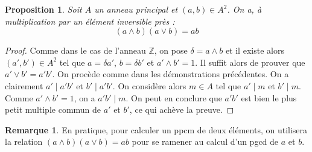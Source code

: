 \documentclass[french]{book}
\newcommand{\Z}{\mathbb{Z}}
\theoremstyle{plain}
\newtheorem{prop}{Proposition}[chapter]
\theoremstyle{definition}
\newtheorem{rmq}{Remarque}[chapter]
\theoremstyle{remark}
\begin{document}
\begin{prop}
	Soit $A$ un anneau principal et $(a,b)\in A^2$. On a, à multiplication par un élément inversible près : $$(a\wedge b)(a\vee b)=ab$$
\end{prop}
\begin{proof}
	Comme dans le cas de l'anneau $\Z$, on pose $\delta=a\wedge b$ et il existe alors $(a',b')\in A^2$ tel que $a=\delta a'$, $b=\delta b'$ et $a'\wedge b'=1$. Il suffit alors de prouver que $a'\vee b'=a'b'$. On procède comme dans les démonstrations précédentes. On a clairement $a'\mid a'b'$ et $b'\mid a'b'$. On considère alors $m\in A$ tel que $a'\mid m$ et $b'\mid m$. Comme $a'\wedge b'=1$, on a $a'b'\mid m$. On peut en conclure que $a'b'$ est bien le plus petit multiple commun de $a'$ et $b'$, ce qui achève la preuve.
\end{proof}
\begin{rmq}
	En pratique, pour calculer un ppcm de deux éléments, on utilisera la relation $(a\wedge b)(a\vee b)=ab$ pour se ramener au calcul d'un pgcd de $a$ et $b$.
\end{rmq}
\end{document}
